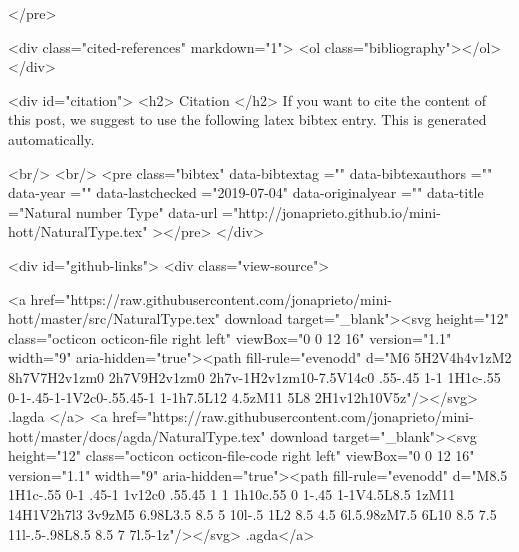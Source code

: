 </pre>


  <div class="cited-references" markdown="1">
  <ol class="bibliography"></ol>
  </div>


  
  <div id="citation">
  <h2> Citation </h2>
  If you want to cite the content of this post,
  we suggest to use the following latex bibtex entry.
  This is generated automatically.

  <br/>
  <br/>
  <pre class="bibtex"
       data-bibtextag =""
       data-bibtexauthors =""
       data-year =""
       data-lastchecked ="2019-07-04"
       data-originalyear =""
       data-title ="Natural number Type"
       data-url ="http://jonaprieto.github.io/mini-hott/NaturalType.tex"
  ></pre>
  </div>
  

  <div id="github-links">
    <div class="view-source">
      
        <a href="https://raw.githubusercontent.com/jonaprieto/mini-hott/master/src/NaturalType.tex" download target="_blank"><svg height="12" class="octicon octicon-file right left" viewBox="0 0 12 16" version="1.1" width="9" aria-hidden="true"><path fill-rule="evenodd" d="M6 5H2V4h4v1zM2 8h7V7H2v1zm0 2h7V9H2v1zm0 2h7v-1H2v1zm10-7.5V14c0 .55-.45 1-1 1H1c-.55 0-1-.45-1-1V2c0-.55.45-1 1-1h7.5L12 4.5zM11 5L8 2H1v12h10V5z"/></svg> .lagda </a>
        <a href="https://raw.githubusercontent.com/jonaprieto/mini-hott/master/docs/agda/NaturalType.tex" download target="_blank"><svg height="12" class="octicon octicon-file-code right left" viewBox="0 0 12 16" version="1.1" width="9" aria-hidden="true"><path fill-rule="evenodd" d="M8.5 1H1c-.55 0-1 .45-1 1v12c0 .55.45 1 1 1h10c.55 0 1-.45 1-1V4.5L8.5 1zM11 14H1V2h7l3 3v9zM5 6.98L3.5 8.5 5 10l-.5 1L2 8.5 4.5 6l.5.98zM7.5 6L10 8.5 7.5 11l-.5-.98L8.5 8.5 7 7l.5-1z"/></svg> .agda</a>
      
